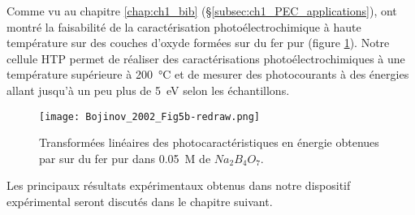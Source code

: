 \begin{refsection}
    Comme vu au chapitre \ref{chap:ch1_bib}
    (\S\ref{subsec:ch1_PEC_applications}),
    \citet{Bojinov2002} ont montré la faisabilité de la caractérisation photoélectrochimique à haute température sur des couches d'oxyde formées sur du
    fer pur (figure \ref{fig:ch3_ht_pec_Bojinov}). Notre cellule HTP
    permet de réaliser des caractérisations photoélectrochimiques à une température supérieure à
    \SI{200}{\degreeCelsius} et de mesurer des photocourants à des énergies allant jusqu'à un peu plus de 5~eV selon les
    échantillons. 
    
    \begin{figure}[H]
        \centering
        \texttt{[image: Bojinov\_2002\_Fig5b-redraw.png]}
        \caption[Transformées linéaires ($IPCE^{1/2}$) des photocaractéristiques en énergie obtenues par M. \textsc{Bojinov} sur du fer pur
        dans 0.05~M de $Na_2B_4O_7$.]
        {Transformées linéaires des photocaractéristiques en énergie obtenues par \citet{Bojinov2002} sur du fer pur
        dans 0.05~M de $Na_2B_4O_7$.}
        \label{fig:ch3_ht_pec_Bojinov}
    \end{figure}

    Les principaux résultats expérimentaux obtenus dans notre dispositif expérimental seront discutés dans le chapitre
    suivant.
\singlespacing
\printbibliography[heading=subbibintoc]
\onehalfspacing
\end{refsection}
